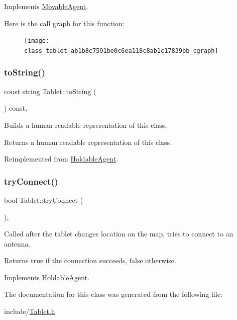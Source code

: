 Implements \mbox{\hyperlink{class_movable_agent_a88b617f0e78c817634e5b587da045ab0}{Movable\+Agent}}.

Here is the call graph for this function\+:
\nopagebreak
\begin{figure}[H]
\begin{center}
\leavevmode
\texttt{[image: class\_tablet\_ab1b8c7591be0c6ea118c8ab1c17839bb\_cgraph]}
\end{center}
\end{figure}
\mbox{\label{class_tablet_a3fae01e7d526699476221c6a686a4fba}} 
\subsubsection{\texorpdfstring{toString()}{toString()}}
{\footnotesize\ttfamily const string Tablet\+::to\+String (\begin{DoxyParamCaption}{ }\end{DoxyParamCaption}) const\hspace{0.3cm}{\ttfamily [override]}, {\ttfamily [virtual]}}

Builds a human readable representation of this class. \begin{DoxyReturn}{Returns}
a human readable representation of this class. 
\end{DoxyReturn}


Reimplemented from \mbox{\hyperlink{class_holdable_agent_a2c581226b8994f24b6b2306ae17dbb52}{Holdable\+Agent}}.

\mbox{\label{class_tablet_a2328422e1706dfeb2b51a6960e6879f0}} 
\subsubsection{\texorpdfstring{tryConnect()}{tryConnect()}}
{\footnotesize\ttfamily bool Tablet\+::try\+Connect (\begin{DoxyParamCaption}{ }\end{DoxyParamCaption})\hspace{0.3cm}{\ttfamily [override]}, {\ttfamily [virtual]}}

Called after the tablet changes location on the map, tries to connect to an antenna. \begin{DoxyReturn}{Returns}
true if the connection succeeds, false otherwise. 
\end{DoxyReturn}


Implements \mbox{\hyperlink{class_holdable_agent_a0789d757d81b43ee016e9362046f6dea}{Holdable\+Agent}}.



The documentation for this class was generated from the following file\+:\begin{DoxyCompactItemize}
\item 
include/\mbox{\hyperlink{_tablet_8h}{Tablet.\+h}}\end{DoxyCompactItemize}
